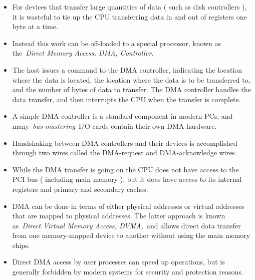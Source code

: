 \documentclass[12pt]{article}
\begin{document}
\begin{itemize}
	\item For devices that transfer large quantities of data ( such as disk controllers ), it is wasteful to tie up the CPU transferring data in and out of registers one byte at a time.\par

	\item Instead this work can be off-loaded to a special processor, known as the \textit{Direct Memory Access, DMA, Controller.}\par

	\item The host issues a command to the DMA controller, indicating the location where the data is located, the location where the data is to be transferred to, and the number of bytes of data to transfer. The DMA controller handles the data transfer, and then interrupts the CPU when the transfer is complete.\par

	\item A simple DMA controller is a standard component in modern PCs, and many \textit{bus-mastering} I/O cards contain their own DMA hardware.\par

	\item Handshaking between DMA controllers and their devices is accomplished through two wires called the DMA-request and DMA-acknowledge wires.\par

	\item While the DMA transfer is going on the CPU does not have access to the PCI bus ( including main memory ), but it does have access to its internal registers and primary and secondary caches.\par

	\item DMA can be done in terms of either physical addresses or virtual addresses that are mapped to physical addresses. The latter approach is known as \textit{Direct Virtual Memory Access, DVMA, }and allows direct data transfer from one memory-mapped device to another without using the main memory chips.\par

	\item Direct DMA access by user processes can speed up operations, but is generally forbidden by modern systems for security and protection reasons.
\end{itemize}\par
\end{document}
